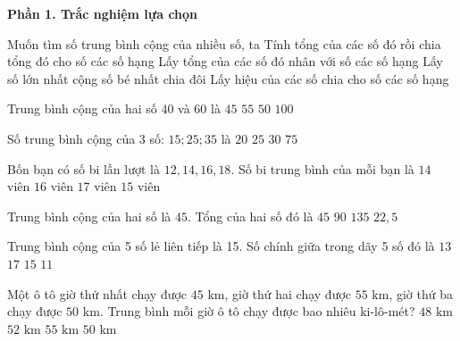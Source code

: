 \textbf{Phần 1. Trắc nghiệm lựa chọn}

\begin{ex} %
Muốn tìm số trung bình cộng của nhiều số, ta
\choice
{\True Tính tổng của các số đó rồi chia tổng đó cho số các số hạng}
{Lấy tổng của các số đó nhân với số các số hạng}
{Lấy số lớn nhất cộng số bé nhất chia đôi}
{Lấy hiệu của các số chia cho số các số hạng}
\end{ex}

\begin{ex} %
Trung bình cộng của hai số $40$ và $60$ là
\choice
{$45$}
{$55$}
{\True $50$}
{$100$}
\end{ex}

\begin{ex} %
Số trung bình cộng của 3 số: $15; 25; 35$ là
\choice
{$20$}
{\True $25$}
{$30$}
{$75$}
\end{ex}

\begin{ex} %
Bốn bạn có số bi lần lượt là $12, 14, 16, 18$. Số bi trung bình của mỗi bạn là
\choice
{$14$ viên}
{$16$ viên}
{$17$ viên}
{\True $15$ viên}
\end{ex}

\begin{ex} %
Trung bình cộng của hai số là $45$. Tổng của hai số đó là
\choice
{$45$}
{\True $90$}
{$135$}
{$22{,}5$}
\end{ex}

\begin{ex} %
Trung bình cộng của 5 số lẻ liên tiếp là 15. Số chính giữa trong dãy 5 số đó là
\choice
{$13$}
{$17$}
{\True $15$}
{$11$}
\end{ex}

\begin{ex} %
Một ô tô giờ thứ nhất chạy được $45\text{ km}$, giờ thứ hai chạy được $55\text{ km}$, giờ thứ ba chạy được $50\text{ km}$. Trung bình mỗi giờ ô tô chạy được bao nhiêu ki-lô-mét?
\choice
{$48\text{ km}$}
{$52\text{ km}$}
{$55\text{ km}$}
{\True $50\text{ km}$}
\end{ex}


